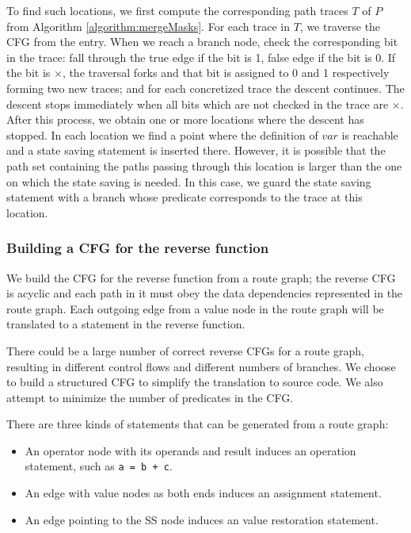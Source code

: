 \documentclass[12pt]{gatech-thesis}
\begin{document}
To find such locations, we first compute the corresponding path traces $T$ of $P$ from Algorithm \ref{algorithm:mergeMasks}. 
For each trace in $T$, we traverse the CFG from the entry. 
When we reach a branch node, check the corresponding bit in the trace: fall through the true edge if the bit is 1, false edge if the bit is 0. 
If the bit is $\times$, the traversal forks and that bit is assigned to 0 and 1 respectively forming two new traces; and for each concretized trace the descent continues. 
The descent stops immediately when all bits which are not checked in the trace are $\times$. 
After this process, we obtain one or more locations where the descent has stopped. 
In each location we find a point where the definition of $var$ is reachable and a state saving statement is inserted there. 
However, it is possible that the path set containing the paths passing through this location is larger than the one on which the state saving is needed. 
In this case, we guard the state saving statement with a branch whose predicate corresponds to the trace at this location.



\subsubsection{Building a CFG for the reverse function}
We build the CFG for the reverse function from a route graph; the reverse CFG is acyclic and each path in it must obey the data dependencies represented in the route graph.
Each outgoing edge from a value node in the route graph will be translated to a statement in the reverse function. 

There could be a large number of correct reverse CFGs for a route graph, resulting in different control flows and different numbers of branches. 
We choose to build a structured CFG to simplify the translation to source code. 
We also attempt to minimize the number of predicates in the CFG. 

There are three kinds of statements that can be generated from a route graph:
\begin{itemize}
	\item An operator node with its operands and result induces an operation statement,  such as \texttt{a = b + c}.
	\item An edge with value nodes as both ends induces an assignment statement.
	\item An edge pointing to the SS node induces an value restoration statement.
\end{itemize}
\end{document}
